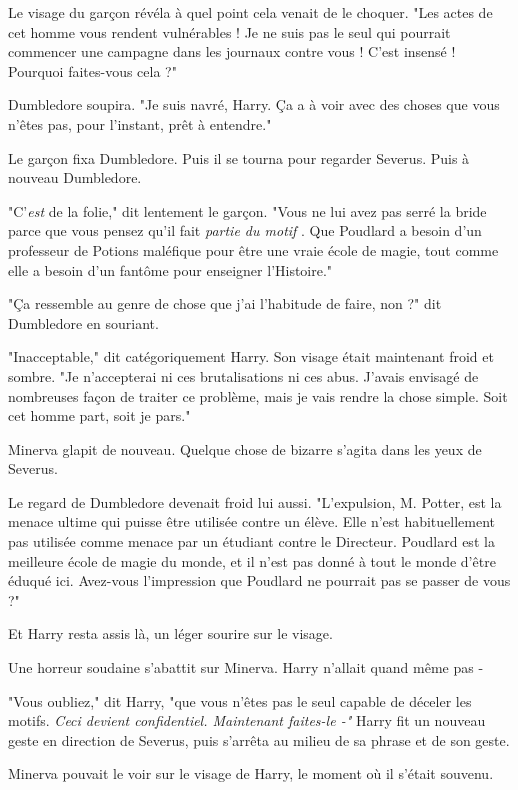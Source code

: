 Le visage du garçon révéla à quel point cela venait de le choquer. "Les actes de cet homme vous rendent vulnérables ! Je ne suis pas le seul qui pourrait commencer une campagne dans les journaux contre vous ! C'est insensé ! Pourquoi faites-vous cela ?"

Dumbledore soupira. "Je suis navré, Harry. Ça a à voir avec des choses que vous n'êtes pas, pour l'instant, prêt à entendre."

Le garçon fixa Dumbledore. Puis il se tourna pour regarder Severus. Puis à nouveau Dumbledore.

"C'\emph{est}  de la folie," dit lentement le garçon. "Vous ne lui avez pas serré la bride parce que vous pensez qu'il fait \emph{partie du motif} . Que Poudlard a besoin d'un professeur de Potions maléfique pour être une vraie école de magie, tout comme elle a besoin d'un fantôme pour enseigner l'Histoire."

"Ça ressemble au genre de chose que j'ai l'habitude de faire, non ?" dit Dumbledore en souriant.

"Inacceptable," dit catégoriquement Harry. Son visage était maintenant froid et sombre. "Je n'accepterai ni ces brutalisations ni ces abus. J'avais envisagé de nombreuses façon de traiter ce problème, mais je vais rendre la chose simple. Soit cet homme part, soit je pars."

Minerva glapit de nouveau. Quelque chose de bizarre s'agita dans les yeux de Severus.

Le regard de Dumbledore devenait froid lui aussi. "L'expulsion, M. Potter, est la menace ultime qui puisse être utilisée contre un élève. Elle n'est habituellement pas utilisée comme menace par un étudiant contre le Directeur. Poudlard est la meilleure école de magie du monde, et il n'est pas donné à tout le monde d'être éduqué ici. Avez-vous l'impression que Poudlard ne pourrait pas se passer de vous ?"

Et Harry resta assis là, un léger sourire sur le visage.

Une horreur soudaine s'abattit sur Minerva. Harry n'allait quand même pas -

"Vous oubliez," dit Harry, "que vous n'êtes pas le seul capable de déceler les motifs. \emph{Ceci devient confidentiel. Maintenant faites-le -"}  Harry fit un nouveau geste en direction de Severus, puis s'arrêta au milieu de sa phrase et de son geste.

Minerva pouvait le voir sur le visage de Harry, le moment où il s'était souvenu.

